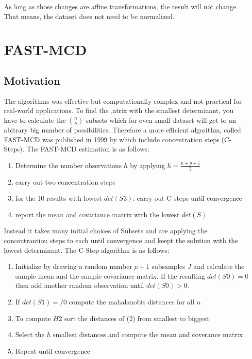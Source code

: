As long as those changes are affine transformations, the result will not change.
That means, the dataset does not need to be normalized.  


\section*{FAST-MCD}
\subsection*{Motivation}
The algorithms was effective but computationally complex and not practical for real-world applications.
To find the ,atrix with the smallest determinant, you have to calculate the $\binom{n}{h}$ subsets which for even small dataset will get to an abitrary big number of possibilities. 
Therefore a more efficient algorithm, called FAST-MCD was published in 1999 by \citet{rousseeuw1999fast} which include concentration steps (C-Steps).
The FAST-MCD estimation is as follows:  

\begin{enumerate}
    \item Determine the number observations $h$ by applying $h = \frac{n+p+1}{2}$
    \item carry out two concentration steps
    \item for the 10 results with lowest $det(S3)$: carry out C-steps until convergence
    \item report the mean and covariance matrix with the lowest $det(S)$
\end{enumerate}
 
Instead it takes many initial choices of Subsets and are applying the concentrantion steps to each until convergence and keept the solution with the lowest determinant.
The C-Step algorithm is as follows:

\begin{enumerate}
    \item Initialize by drawing a random number $p+1$ subsamples $J$ and calculate the sample mean and the sample covariance matrix. If the resulting $det(S0)=0$ then add another random observation until $det(S0)>0$.
    \item If $det(S1)=/0$ compute the mahalanobis distances for all $n$
    \item To compute $H2$ sort the distances of (2) from smallest to biggest
    \item Select the $h$ smallest distances and compute the mean and coverance matrix
    \item Repeat until convergence
\end{enumerate}
\citep[p.214]{rousseeuw1999fast}


